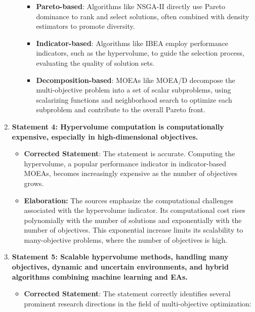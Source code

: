 \documentclass[
]{article}
\begin{document}
\begin{enumerate}
\begin{itemize}
    \begin{itemize}
    
    \item
      \textbf{Pareto-based}: Algorithms like NSGA-II directly use Pareto
      dominance to rank and select solutions, often combined with
      density estimators to promote diversity.
    \item
      \textbf{Indicator-based}: Algorithms like IBEA employ performance
      indicators, such as the hypervolume, to guide the selection
      process, evaluating the quality of solution sets.
    \item
      \textbf{Decomposition-based}: MOEAs like MOEA/D decompose the
      multi-objective problem into a set of scalar subproblems, using
      scalarizing functions and neighborhood search to optimize each
      subproblem and contribute to the overall Pareto front.
    \end{itemize}
  \end{itemize}
\item
  \textbf{Statement 4: Hypervolume computation is computationally
  expensive, especially in high-dimensional objectives.}

  \begin{itemize}
  
  \item
    \textbf{Corrected Statement}: The statement is accurate. Computing
    the hypervolume, a popular performance indicator in indicator-based
    MOEAs, becomes increasingly expensive as the number of objectives
    grows.
  \item
    \textbf{Elaboration:} The sources emphasize the computational
    challenges associated with the hypervolume indicator. Its
    computational cost rises polynomially with the number of solutions
    and exponentially with the number of objectives. This exponential
    increase limits its scalability to many-objective problems, where
    the number of objectives is high.
  \end{itemize}
\item
  \textbf{Statement 5: Scalable hypervolume methods, handling many
  objectives, dynamic and uncertain environments, and hybrid algorithms
  combining machine learning and EAs.}

  \begin{itemize}
  
  \item
    \textbf{Corrected Statement}: The statement correctly identifies
    several prominent research directions in the field of
    multi-objective optimization:


\end{itemize}
\end{enumerate}
\end{document}
